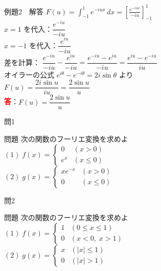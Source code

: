 \documentclass[professionalfonts]{beamer}
\begin{document}
\begin{frame}{例題2　解答}
  $F(u) = \displaystyle\int_{-1}^{1}e^{-iux}\,dx
    = \!\left[\frac{e^{-iux}}{-iu}\right]_{-1}^{1}$\\[8pt]
  $x=1$ を代入：$\dfrac{e^{-iu}}{-iu}$\\[6pt]
  $x=-1$ を代入：$\dfrac{e^{iu}}{-iu}$\\[6pt]
  差を計算：
  $\dfrac{e^{-iu}}{-iu} - \dfrac{e^{iu}}{-iu}
    = \dfrac{e^{-iu}-e^{iu}}{-iu}
    = \dfrac{e^{iu}-e^{-iu}}{iu}$\\[8pt]
  オイラーの公式 $e^{i\theta}-e^{-i\theta}=2i\sin\theta$ より\\[4pt]
  \hspace{2em}$F(u) = \dfrac{2i\sin u}{iu} = \dfrac{2\sin u}{u}$
  \\[8pt]\textcolor{red}{\textbf{答}}：$F(u) = \dfrac{2\sin u}{u}$
\end{frame}

\begin{frame}{問1　}
  \begin{exampleblock}{問題}
    次の関数のフーリエ変換を求めよ\\[4pt]
    $(1)\; f(x) = \begin{cases} 0 & (x > 0) \\ e^{x} & (x \leq 0) \end{cases}$\\[6pt]
    $(2)\; g(x) = \begin{cases} xe^{-x} & (x > 0) \\ 0 & (x \leq 0) \end{cases}$
  \end{exampleblock}
\end{frame}

\begin{frame}{問2　}
  \begin{exampleblock}{問題}
    次の関数のフーリエ変換を求めよ\\[4pt]
    $(1)\; f(x) = \begin{cases} 1 & (0 \leq x \leq 1) \\ 0 & (x < 0,\; x > 1) \end{cases}$\\[6pt]
    $(2)\; g(x) = \begin{cases} x & (|x| \leq 1) \\ 0 & (|x| > 1) \end{cases}$
  \end{exampleblock}
\end{frame}
\end{document}

